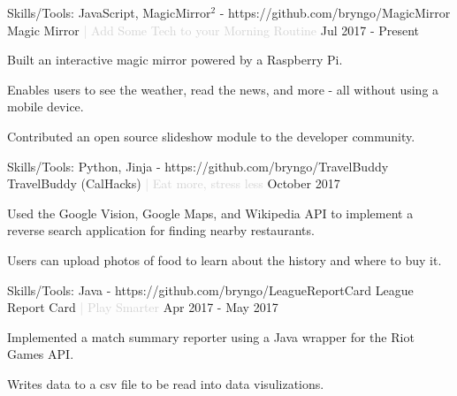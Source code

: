 

\begin{cventries}

  \cventry
  {Skills/Tools: JavaScript, MagicMirror$^2$ - https://github.com/bryngo/MagicMirror} %
  {Magic Mirror \textcolor{lightgray}{| Add Some Tech to your Morning Routine}} %
  {} %
  {Jul 2017 - Present} %
  {
  \begin{cvitems} %
    \item {Built an interactive magic mirror powered by a Raspberry Pi.}
    \item {Enables users to see the weather, read the news, and more - all without using a mobile device.}
    \item {Contributed an open source slideshow module to the developer community.}
  \end{cvitems}
  }

  \cventry
  {Skills/Tools: Python, Jinja - https://github.com/bryngo/TravelBuddy} %
  {TravelBuddy (CalHacks) \textcolor{lightgray}{| Eat more, stress less}} %
  {} %
  {October 2017} %
  {
  \begin{cvitems} %
    \item {Used the Google Vision, Google Maps, and Wikipedia API to implement a reverse search application for finding nearby restaurants.}
    \item {Users can upload photos of food to learn about the history and where to buy it.}
  \end{cvitems}
  }


  \cventry
  {Skills/Tools: Java - https://github.com/bryngo/LeagueReportCard} %
  {League Report Card \textcolor{lightgray}{| Play Smarter}} %
  {} %
  {Apr 2017 - May 2017} %
  {
  \begin{cvitems} %
    \item {Implemented a match summary reporter using a Java wrapper for the Riot Games API.}
    \item {Writes data to a csv file to be read into data visulizations.}
  \end{cvitems}
  }


\end{cventries}
